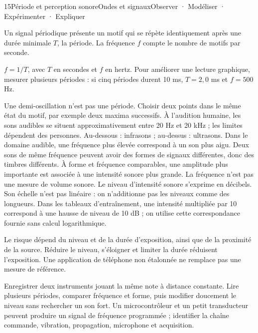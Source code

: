 \begin{ouverture}[son]{15}{Période et perception sonore}{Ondes et signaux}{Observer · Modéliser · Expérimenter · Expliquer}
\end{ouverture}
\essentiel
{}
Un signal périodique présente un motif qui se répète identiquement après une durée minimale $T$, la période. La fréquence $f$ compte le nombre de motifs par seconde.
\begin{loi}$f=1/T$, avec $T$ en secondes et $f$ en hertz. Pour améliorer une lecture graphique, mesurer plusieurs périodes : si cinq périodes durent 10 ms, $T=2,0$ ms et $f=500$ Hz.\end{loi}
Une demi-oscillation n'est pas une période. Choisir deux points dans le même état du motif, par exemple deux maxima successifs.
À l'audition humaine, les sons audibles se situent approximativement entre 20 Hz et 20 kHz ; les limites dépendent des personnes. Au-dessous : infrasons ; au-dessus : ultrasons. Dans le domaine audible, une fréquence plus élevée correspond à un son plus aigu.
Deux sons de même fréquence peuvent avoir des formes de signaux différentes, donc des timbres différents. À forme et fréquence comparables, une amplitude plus importante est associée à une intensité sonore plus grande. La fréquence n'est pas une mesure de volume sonore.
Le niveau d'intensité sonore s'exprime en décibels. Son échelle n'est pas linéaire : on n'additionne pas les niveaux comme des longueurs. Dans les tableaux d'entraînement, une intensité multipliée par 10 correspond à une hausse de niveau de 10 dB ; on utilise cette correspondance fournie sans calcul logarithmique.
\begin{attention}Le risque dépend du niveau et de la durée d'exposition, ainsi que de la proximité de la source. Réduire le niveau, s'éloigner et limiter la durée réduisent l'exposition. Une application de téléphone non étalonnée ne remplace pas une mesure de référence.\end{attention}
\begin{experience}Enregistrer deux instruments jouant la même note à distance constante. Lire plusieurs périodes, comparer fréquence et forme, puis modifier doucement le niveau sans rechercher un son fort. Un microcontrôleur et un petit transducteur peuvent produire un signal de fréquence programmée ; identifier la chaîne commande, vibration, propagation, microphone et acquisition.\end{experience}
